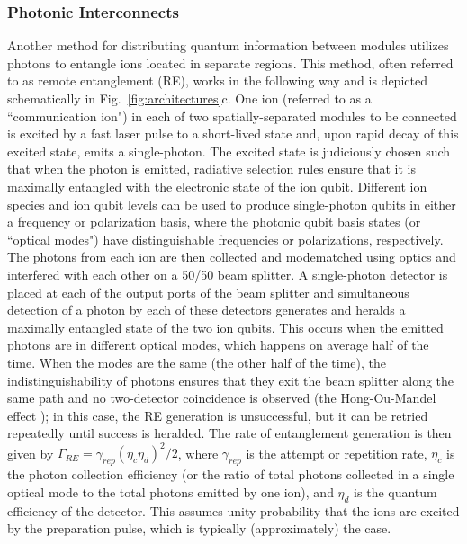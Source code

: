 \documentclass[%
12pt,
 amsmath,amssymb,
]{revtex4-2}
\begin{document}
    \subsubsection{Photonic Interconnects}
    \label{PhotonInter}
Another method for distributing quantum information between modules utilizes photons \cite{MonroeModularArch2014} to entangle ions located in separate regions.  This method, often referred to as remote entanglement (RE), works in the following way and is depicted schematically in Fig.~\ref{fig:architectures}c.  One ion (referred to as a ``communication ion") in each of two spatially-separated modules to be connected is excited by a fast laser pulse to a short-lived state and, upon rapid decay of this excited state, emits a single-photon.  The excited state is judiciously chosen such that when the photon is emitted, radiative selection rules ensure that it is maximally entangled with the electronic state of the ion qubit.  Different ion species and ion qubit levels can be used to produce single-photon qubits in either a frequency \cite{Moehring2007} or polarization \cite{BlinovIonPhotonEntangle2004} basis, where the photonic qubit basis states (or ``optical modes") have distinguishable frequencies or polarizations, respectively.  The photons from each ion are then collected and modematched using optics and interfered with each other on a 50/50 beam splitter.  A single-photon detector is placed at each of the output ports of the beam splitter and simultaneous detection of a photon by each of these detectors generates and heralds a maximally entangled state of the two ion qubits.  This occurs when the emitted photons are in different optical modes, which happens on average half of the time.  When the modes are the same (the other half of the time), the indistinguishability of photons ensures that they exit the beam splitter along the same path and no two-detector coincidence is observed (the Hong-Ou-Mandel effect \cite{HongOuMandel1987}); in this case, the RE generation is unsuccessful, but it can be retried repeatedly until success is heralded.  The rate of entanglement generation is then given by $\Gamma_{RE}=\gamma_{rep}(\eta_{c}\eta_{d})^2/2$, where $\gamma_{rep}$ is the attempt or repetition rate, $\eta_{c}$ is the photon collection efficiency (or the ratio of total photons collected in a single optical mode to the total photons emitted by one ion), and $\eta_{d}$ is the quantum efficiency of the detector.  This assumes unity probability that the ions are excited by the preparation pulse, which is typically (approximately) the case.
\end{document}
